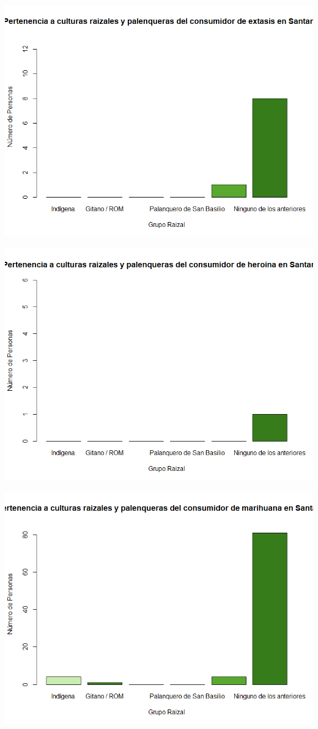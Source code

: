 \documentclass[
]{article}
\begin{document}
\includegraphics{images/extasis cultura santander.png}

\includegraphics{images/heroina cultura santander.png}

\includegraphics{images/marihuana cultura santander.png}
\end{document}
